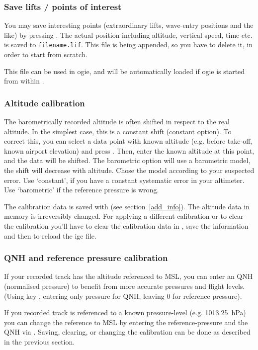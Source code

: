 \subsubsection{Save lifts / points of interest}
You may save interesting points (extraordinary lifts, wave-entry positions and the like) by pressing .
The actual position including altitude, vertical speed, time etc. is saved to \texttt{filename.lif}.
This file is being appended, so you have to delete it, in order to start from scratch.

This file can be used in ogie, and will be automatically loaded if ogie is started from within .


\subsubsection{Altitude calibration}
The barometrically recorded altitude is often shifted in respect to the real altitude.
In the simplest case, this is a constant shift (constant option).
To correct this, you can select a data point with known altitude
(e.g. before take-off, known airport elevation) and press .
Then, enter the known altitude at this point, and the data will be shifted.
The barometric option will use a barometric model, the shift will decrease with altitude.
Chose the model according to your suspected error. Use `constant', if you have a constant systematic error in your altimeter.
Use `barometric' if the reference pressure is wrong.

The calibration data is saved with  (see section~\ref{add_info}).
The altitude data in memory is irreversibly changed. For applying a different calibration or to clear the calibration you'll have to clear the calibration data in
 , save the information and then to reload the igc file.


\subsubsection{QNH and reference pressure calibration}
If your recorded track has the altitude referenced to MSL, you can enter an QNH (normalised pressure) to benefit from more accurate pressures and flight levels.
(Using key , entering only pressure for QNH, leaving 0 for reference pressure).

If you recorded track is referenced to a known pressure-level (e.g. 1013.25~hPa) you can change the reference to MSL by entering the reference-pressure and the QNH via .
Saving, clearing, or changing the calibration can be done as described in the previous section.

